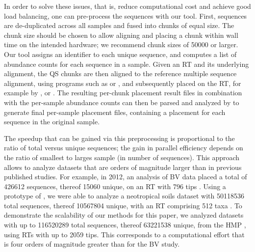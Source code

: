 In order to solve these issues, that is, reduce computational cost and achieve good load balancing,
one can pre-process the sequences with our  tool.
First, sequences are de-duplicated across all samples and fused into chunks of equal size.
The chunk size should be chosen to allow aligning and placing a chunk within wall time on the intended hardware;
we recommend chunk sizes of \num{50 000} or larger.
Our tool assigns an identifier to each unique sequence, and
computes a list of abundance counts for each sequence in a sample.
Given an \ac{RT} and its underlying alignment, the \ac{QS} chunks are then aligned to the reference multiple sequence alignment,
using programs such as   \citep{Berger2012,Berger2011a}
or  \citep{Eddy1998,Eddy2009},
and subsequently placed on the \ac{RT},
for example by ,  or  \citep{Matsen2010,Berger2011,Barbera2018}.
The resulting per-chunk placement result files in combination with the per-sample abundance counts
can then be parsed and analyzed by  to generate final per-sample placement files,
containing a placement for each sequence in the original sample.

The speedup that can be gained via this preprocessing is proportional to the ratio of total versus unique sequences;
the gain in parallel efficiency depends on the ratio of smallest to larges sample (in number of sequences).
This approach allows to analyze datasets that are orders of magnitude larger than in previous published studies.
For example, in 2012, an analysis of \acf{BV} data
placed a total of \num{426 612} sequences, thereof \num{15 060} unique,
on an \ac{RT} with \num{796} tips \citep{Srinivasan2012}.
Using a prototype of ,
we were able to analyze a neotropical soils dataset with \num{50 118 536} total sequences, thereof \num{10 567 804} unique,
with an \ac{RT} comprising \num{512} taxa \citep{Mahe2017}.
To demonstrate the scalability of our methods for this paper,
we analyzed datasets with up to \num{116 520 289} total sequences, thereof \num{63 221 538} unique,
from the \ac{HMP} \citep{Huttenhower2012,Methe2012}, using \acp{RT} with up to \num{2 059} tips.
This corresponds to %
a computational effort that is four orders of magnitude greater than for the \ac{BV} study.

